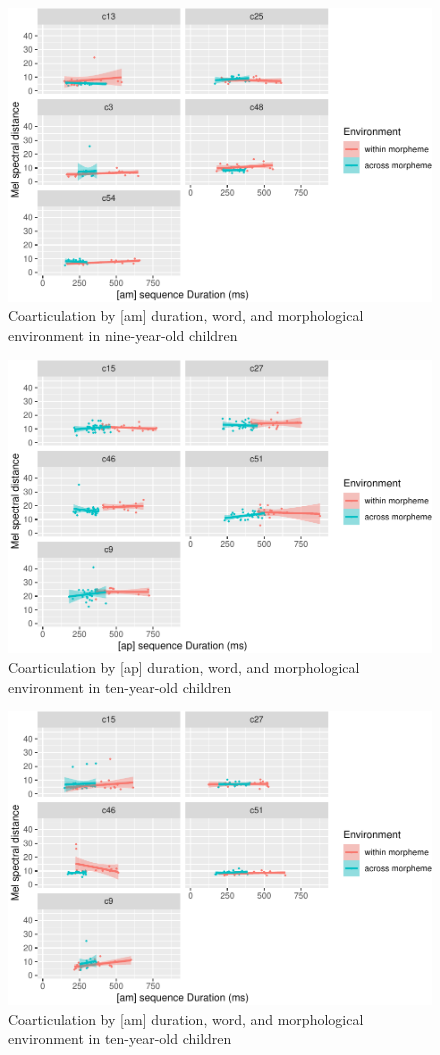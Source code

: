 \documentclass[
]{article}
\begin{document}
\begin{figure}
\centering
\includegraphics{3_ch3_results_files/figure-latex/nine-facet-am-1.pdf}
\caption{\label{fig:nine-facet-am}Coarticulation by {[}am{]} duration, word, and morphological environment in nine-year-old children}
\end{figure}

\begin{figure}
\centering
\includegraphics{3_ch3_results_files/figure-latex/ten-facet-ap-1.pdf}
\caption{\label{fig:ten-facet-ap}Coarticulation by {[}ap{]} duration, word, and morphological environment in ten-year-old children}
\end{figure}

\begin{figure}
\centering
\includegraphics{3_ch3_results_files/figure-latex/ten-facet-am-1.pdf}
\caption{\label{fig:ten-facet-am}Coarticulation by {[}am{]} duration, word, and morphological environment in ten-year-old children}
\end{figure}
\end{document}
